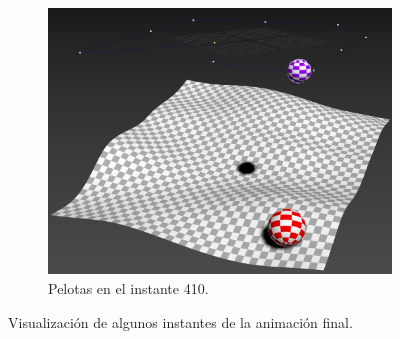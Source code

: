 \begin{figure}[H]
    \par\bigskip
	\begin{subfigure}[t]{0.48\textwidth}
	    \centering
	    \includegraphics[width=\textwidth]{imagenes/rotacion/410.jpg}
        \caption{Pelotas en el instante 410.}
    \end{subfigure}        
    \caption{Visualización de algunos instantes de la animación final.}
\end{figure}